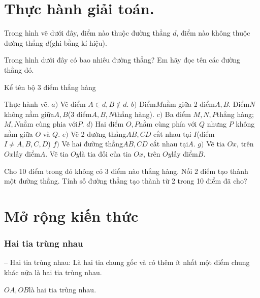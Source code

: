\section{Thực hành giải toán.}
\begin{vd}
	Trong hình vẽ dưới đây, điểm nào thuộc đường thẳng $d$, điểm nào không thuộc đường thẳng $d$(ghi bằng kí hiệu).
\end{vd}
\begin{vd}
	Trong hình dưới đây có bao nhiêu đường thẳng? Em hãy đọc tên các đường thẳng đó.
\end{vd}
\begin{vd}
	Kể tên bộ 3 điểm thẳng hàng                         
\end{vd}
\begin{vd}
	Thực hành vẽ.
	$a)$ Vẽ điểm $A\in d,B\notin d.$
	$b)$ Điểm$M$nằm giữa 2 điểm$A,B$.
	Điểm$N$không nằm giữa$A,B$(3 điểm$A,B,N$thẳng hàng).
	$c)$ Ba điểm $M,N,P$thẳng hàng; $M,N$nằm cùng phia với$P$.
	$d)$ Hai điểm $O,P$nằm cùng phía với $Q$ nhưng $P$ không nằm giữa $O$ và $Q$.
	$e)$ Vẽ 2 đường thẳng$AB,CD$ cắt nhau tại $I$(điểm $I\ne A,B,C,D$)
	$f)$ Vẽ hai đường thẳng$AB,CD$ cắt nhau tại$A$.
	$g)$ Vẽ tia $Ox$, trên $Ox$lấy điểm$A$.
	Vẽ tia $Oy$là tia đối của tia $Ox$, trên $Oy$lấy điểm$B$.    
\end{vd}
\begin{vd}
	Cho 10 điểm trong đó không có 3 điểm nào thẳng hàng. Nối 2 điểm tạo thành một đường thẳng. Tính số đường thẳng tạo thành từ 2 trong 10 điểm đã cho?
\end{vd}
\section{Mở rộng kiến thức}
\subsubsection{Hai tia trùng nhau}
-- Hai tia trùng nhau: Là hai tia chung gốc và có thêm ít nhất một điểm chung khác nữa là hai tia trùng nhau.
\begin{center}
	\begin{tikzpicture}
		
	\end{tikzpicture}
\end{center}
$OA,OB$là hai tia trùng nhau.


